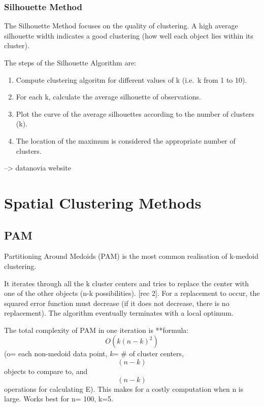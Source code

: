 \documentclass[12pt,twoside]{amherstthesis}
\providecommand{\tightlist}{%
  \setlength{\itemsep}{0pt}\setlength{\parskip}{0pt}}
\begin{document}
  \subsection{Silhouette Method}\label{silhouette-method}
  
  The Silhouette Method focuses on the quality of clustering. A high
  average silhouette width indicates a good clustering (how well each
  object lies within its cluster).
  
  The steps of the Silhouette Algorithm are:
  
  \begin{enumerate}
  \def\labelenumi{\arabic{enumi}.}
  \tightlist
  \item
    Compute clustering algoritm for different values of k (i.e.~k from 1
    to 10).
  \item
    For each k, calculate the average silhouette of observations.
  \item
    Plot the curve of the average silhouettes according to the number of
    clusters (k).
  \item
    The location of the maximum is considered the appropriate number of
    clusters.
  \end{enumerate}
  
  --\textgreater{} datanovia website
  
  \chapter{Spatial Clustering Methods}\label{typeset-equ}
  
  \section{PAM}\label{pam}
  
  Partitioning Around Medoids (PAM) is the most common realisation of
  k-medoid clustering.
  
  It iterates through all the k cluster centers and tries to replace the
  center with one of the other objects (n-k possibilities). {[}rec 2{]}.
  For a replacement to occur, the squared error function must decrease (if
  it does not decrease, there is no replacement). The algorithm eventually
  terminates with a local optimum.
  
  The total complexity of PAM in one iteration is **formula:
  \[O(k(n-k)^2)\] (o= each non-medoid data point, \emph{k}= \# of cluster
  centers, \[(n-k)\] objects to compare to, and \[(n-k)\] operations for
  calculating E). This makes for a costly computation when n is large.
  Works best for n= 100, k=5.
  
\end{document}

